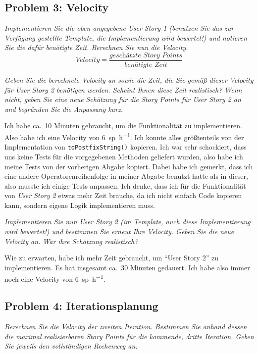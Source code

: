 \documentclass[
  ngerman,
  DIV=14
]{scrartcl}
\begin{document}
\subsection*{Problem 3: Velocity}
\emph{Implementieren Sie die oben angegebene User Story 1 (benutzen Sie das zur Verfügung gestellte Template, die Implementierung wird bewertet!) und notieren Sie die dafür benötigte Zeit. Berechnen Sie nun die Velocity.}
\begin{equation*}
\textit{Velocity} = \frac{\textit{geschätzte Story Points}}{\textit{benötigte Zeit}}  
\end{equation*}

\medskip\noindent
\emph{Geben Sie die berechnete Velocity an sowie die Zeit, die Sie gemäß dieser Velocity für User Story 2 benötigen werden. Scheint Ihnen diese Zeit realistisch? Wenn nicht, geben Sie eine neue Schätzung für die Story Points für User Story 2 an und begründen Sie die Anpassung kurz.}

\medskip\noindent
Ich habe ca.\ 10 Minuten gebraucht, um die Funktionalität zu implementieren. Also habe ich eine Velocity von \SI{6}{sp\per\hour}. Ich konnte alles größtenteils von der Implementation von \texttt{toPostfixString()} kopieren. Ich war sehr schockiert, dass uns keine Tests für die vorgegebenen Methoden geliefert wurden, also habe ich meine Tests von der vorherigen Abgabe kopiert. Dabei habe ich gemerkt, dass ich eine andere Operatorenreihenfolge in meiner Abgabe benutzt hatte als in dieser, also musste ich einige Tests anpassen. Ich denke, dass ich für die Funktionalität von \emph{User Story 2} etwas mehr Zeit brauche, da ich nicht einfach Code kopieren kann, sondern eigene Logik implementieren muss. 

\bigskip\noindent
\emph{Implementieren Sie nun User Story 2 (im Template, auch diese Implementierung wird bewertet!) und bestimmen Sie erneut Ihre Velocity. Geben Sie die neue Velocity an. War ihre Schätzung realistisch?}

\medskip\noindent
Wie zu erwarten, habe ich mehr Zeit gebraucht, um \enquote{User Story 2} zu implementieren. Es hat insgesamt ca.\ 30 Minuten gedauert. Ich habe also immer noch eine Velocity von \SI{6}{sp\per\hour}. 

\subsection*{Problem 4: Iterationsplanung}
\emph{Berechnen Sie die Velocity der zweiten Iteration. Bestimmen Sie anhand dessen die maximal realisierbaren Story Points für die kommende, dritte Iteration. Geben Sie jeweils den vollständigen Rechenweg an.}
\end{document}
